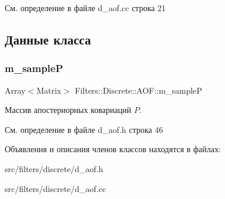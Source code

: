 См. определение в файле d\+\_\+aof.\+cc строка 21



\subsection{Данные класса}
\hypertarget{class_filters_1_1_discrete_1_1_a_o_f_aef55ce0cf7129bb7090f8e470bcfbc1f}{}\label{class_filters_1_1_discrete_1_1_a_o_f_aef55ce0cf7129bb7090f8e470bcfbc1f} 
\subsubsection{\texorpdfstring{m\+\_\+sampleP}{m\_sampleP}}
{\footnotesize\ttfamily Array$<$Matrix$>$ Filters\+::\+Discrete\+::\+A\+O\+F\+::m\+\_\+sampleP\hspace{0.3cm}{\ttfamily [protected]}}

Массив апостериорных ковариаций $P$. 

См. определение в файле d\+\_\+aof.\+h строка 46



Объявления и описания членов классов находятся в файлах\+:\begin{DoxyCompactItemize}
\item 
src/filters/discrete/d\+\_\+aof.\+h\item 
src/filters/discrete/d\+\_\+aof.\+cc\end{DoxyCompactItemize}
